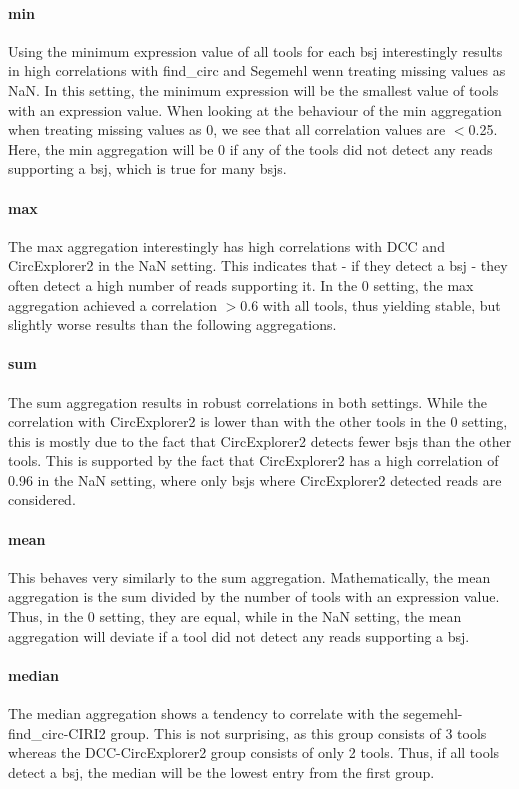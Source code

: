 \paragraph{min}
Using the minimum expression value of all tools for each \gls{bsj}
interestingly results in high correlations with find\_circ and Segemehl wenn
treating missing values as NaN.
In this setting, the minimum expression will be the smallest value of tools
with an expression value.
When looking at the behaviour of the min aggregation when treating missing
values as 0, we see that all correlation values are $<$0.25.
Here, the min aggregation will be 0 if any of the tools did not detect any
reads supporting a \gls{bsj}, which is true for many \gls{bsj}s.

\paragraph{max}
The max aggregation interestingly has high correlations with DCC and
CircExplorer2 in the NaN setting.
This indicates that - if they detect a \gls{bsj} - they often detect a high
number of reads supporting it.
In the 0 setting, the max aggregation achieved a correlation $>$0.6 with all
tools, thus yielding stable, but slightly worse results than the following
aggregations.

\paragraph{sum}
The sum aggregation results in robust correlations in both settings.
While the correlation with CircExplorer2 is lower than with the other tools in
the 0 setting, this is mostly due to the fact that CircExplorer2 detects fewer
\gls{bsj}s than the other tools.
This is supported by the fact that CircExplorer2 has a high correlation of 0.96
in the NaN setting, where only \gls{bsj}s where CircExplorer2 detected reads
are considered.

\paragraph{mean}
This behaves very similarly to the sum aggregation.
Mathematically, the mean aggregation is the sum divided by the number of tools
with an expression value.
Thus, in the 0 setting, they are equal, while in the NaN setting, the mean
aggregation will deviate if a tool did not detect any reads supporting a
\gls{bsj}.

\paragraph{median}
The median aggregation shows a tendency to correlate with the
segemehl-find\_circ-CIRI2 group.
This is not surprising, as this group consists of 3 tools whereas the
DCC-CircExplorer2 group consists of only 2 tools. Thus, if all tools detect a
\gls{bsj}, the median will be the lowest entry from the first group.